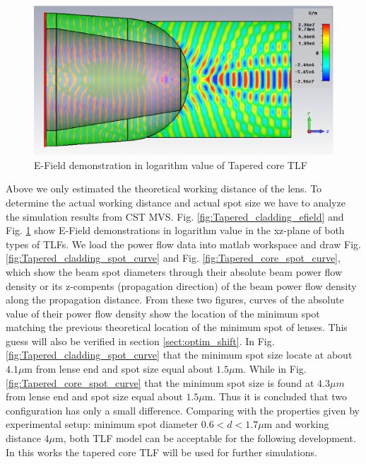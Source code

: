 \begin{figure}[!ht]
	\centering
		\includegraphics[width=0.8 \textwidth]{bilder/cst_lensed_fiber_efield}
		\caption{E-Field demonstration in logarithm value of Tapered core TLF}
 		\label{fig:Tapered_core_efield}	
\end{figure}
Above we only estimated the theoretical working distance of the lens. To determine the actual working distance and actual spot size we have to analyze the simulation results from CST MVS. Fig. \ref{fig:Tapered_cladding_efield} and Fig. \ref{fig:Tapered_core_efield} show  E-Field demonstrations  in logarithm value in the xz-plane of both types of TLFs. We load the power flow data into matlab workspace and draw Fig. \ref{fig:Tapered_cladding_spot_curve} and Fig. \ref{fig:Tapered_core_spot_curve}, which show the beam spot diameters through their absolute beam power flow density or its z-compents (propagation direction) of the beam power flow density along the propagation distance. From these two figures, curves of the absolute value of their power flow density show the location of the minimum spot matching the previous theoretical location of the minimum spot of lenses. This guess will also be verified in section \ref{sect:optim_shift}. In Fig. \ref{fig:Tapered_cladding_spot_curve} that the minimum spot size locate at about $4.1 \mu$m from lense end and spot size equal about $1.5 \mu$m. While in Fig. \ref{fig:Tapered_core_spot_curve} that the minimum spot size is found at  $4.3 \mu m$ from lense end and spot size equal about $1.5 \mu$m. Thus it is concluded that two configuration has only a small difference. Comparing with the properties given by experimental setup: minimum spot diameter $0.6<d<1.7 \mu$m and working distance $4\mu$m, both TLF model can be acceptable for the following development. In this works the tapered core TLF will be used for further simulations.\\

